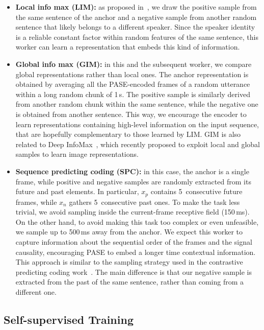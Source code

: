 \documentclass[a4paper]{article}
\begin{document}
\begin{itemize}
  \item \textbf{Local info max (LIM):} as proposed in~\cite{ravanelli2018learning}, we draw the positive sample from the same sentence of the anchor and a negative sample from another random sentence that likely belongs to a different speaker. Since the speaker identity is a reliable constant factor within random features of the same sentence, this worker can learn a representation that embeds this kind of information.
  
  \item \textbf{Global info max (GIM):} 
in this and the subsequent worker, we compare global representations rather than local ones. The anchor representation is obtained by averaging all the PASE-encoded frames of a random utterance within a long random chunk of 1\,s. The positive sample is similarly derived from another random chunk within the same sentence, while the negative one is obtained from another sentence. This way, we encourage the encoder to learn representations containing high-level information on the input sequence, that are hopefully complementary to those learned by LIM. GIM is also related to Deep InfoMax~\cite{hjelm2018learning}, which recently proposed to exploit local and global samples to learn image representations.

 
  \item \textbf{Sequence predicting coding (SPC):} in this case, the anchor is a single frame, while positive and negative samples are randomly extracted from its future and past elements. In particular, $x_{p}$ contains 5~consecutive future frames, while $x_n$ gathers 5~consecutive past ones. To make the task less trivial, we avoid sampling inside the current-frame receptive field (150\,ms). On the other hand, to avoid making this task too complex or even unfeasible, we sample up to 500\,ms away from the anchor. We expect this worker to capture information about the sequential order of the frames and the signal causality, encouraging PASE to embed a longer time contextual information. This approach is similar to the sampling strategy used in the contrastive predicting coding work~\cite{van2017neural}. The main difference is that our negative sample is extracted from the past of the same sentence, rather than coming from a different one. 

\end{itemize}


\subsection{Self-supervised Training}
\label{sec:exp_setup_semisuptrain}
\end{document}
